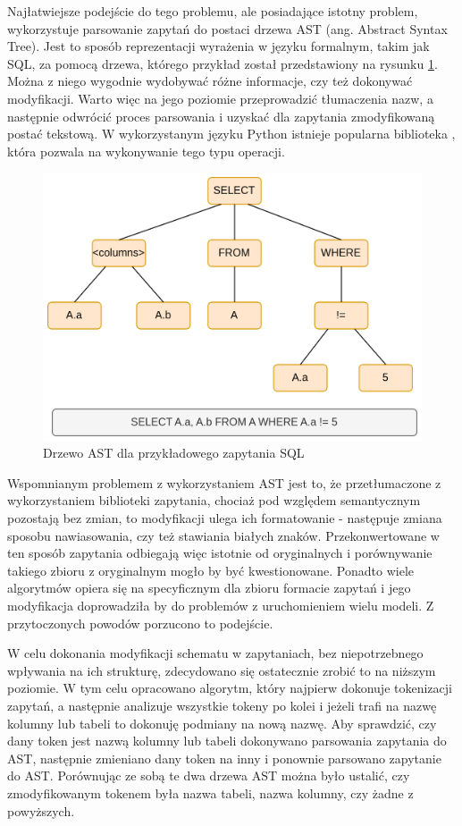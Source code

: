 Najłatwiejsze podejście do tego problemu, ale posiadające istotny problem, wykorzystuje parsowanie zapytań do postaci drzewa AST (ang. Abstract Syntax Tree). Jest to sposób reprezentacji wyrażenia w języku formalnym, takim jak SQL, za pomocą drzewa, którego przykład został przedstawiony na rysunku \ref{fig:ast-example}. Można z niego wygodnie wydobywać różne informacje, czy też dokonywać modyfikacji. Warto więc na jego poziomie przeprowadzić tłumaczenia nazw, a następnie odwrócić proces parsowania i uzyskać dla zapytania zmodyfikowaną postać tekstową. W wykorzystanym języku Python istnieje popularna biblioteka , która pozwala na wykonywanie tego typu operacji. 

\begin{figure}[ht!]
  \centering
  \includegraphics[width=0.6\linewidth]{images/ast_example.png}
  \caption{Drzewo AST dla przykładowego zapytania SQL}
  \label{fig:ast-example}
\end{figure}

Wspomnianym problemem z wykorzystaniem AST jest to, że przetłumaczone z wykorzystaniem biblioteki  zapytania, chociaż pod względem semantycznym pozostają bez zmian, to modyfikacji ulega ich formatowanie - następuje zmiana sposobu nawiasowania, czy też stawiania białych znaków. Przekonwertowane w ten sposób zapytania odbiegają więc istotnie od oryginalnych i porównywanie takiego zbioru z oryginalnym  mogło by być kwestionowane. Ponadto wiele algorytmów opiera się na specyficznym dla zbioru  formacie zapytań i jego modyfikacja doprowadziła by do problemów z uruchomieniem wielu modeli. Z przytoczonych powodów porzucono to podejście.

W celu dokonania modyfikacji schematu w zapytaniach, bez niepotrzebnego wpływania na ich strukturę, zdecydowano się ostatecznie zrobić to na niższym poziomie. W tym celu opracowano algorytm, który najpierw dokonuje tokenizacji zapytań, a następnie analizuje wszystkie tokeny po kolei i jeżeli trafi na nazwę kolumny lub tabeli to dokonuję podmiany na nową nazwę. Aby sprawdzić, czy dany token jest nazwą kolumny lub tabeli dokonywano parsowania zapytania do AST, następnie zmieniano dany token na inny i ponownie parsowano zapytanie do AST. Porównując ze sobą te dwa drzewa AST można było ustalić, czy zmodyfikowanym tokenem była nazwa tabeli, nazwa kolumny, czy żadne z powyższych.

